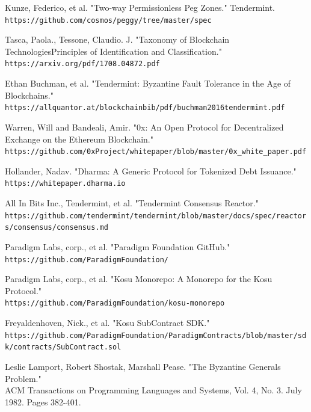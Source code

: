 \documentclass[10pt]{article}
\begin{document}
\begin{thebibliography}{9}

Kunze, Federico, et al. "Two-way Permissionless Peg Zones." Tendermint.
\\\texttt{https://github.com/cosmos/peggy/tree/master/spec}

Tasca, Paola., Tessone, Claudio. J. "Taxonomy of Blockchain TechnologiesPrinciples of Identification and Classification."
\\\texttt{https://arxiv.org/pdf/1708.04872.pdf}

Ethan Buchman, et al. "Tendermint: Byzantine Fault Tolerance in the Age of Blockchains."
\\\small\texttt{https://allquantor.at/blockchainbib/pdf/buchman2016tendermint.pdf}

Warren, Will and Bandeali, Amir. "0x: An Open Protocol for Decentralized Exchange on the Ethereum Blockchain."
\\\texttt{https://github.com/0xProject/whitepaper/blob/master/0x\_white\_paper.pdf}

Hollander, Nadav. "Dharma: A Generic Protocol for Tokenized Debt Issuance."
\\\texttt{https://whitepaper.dharma.io}

All In Bits Inc., Tendermint, et al. "Tendermint Consensus Reactor."
\\\small\texttt{https://github.com/tendermint/tendermint/blob/master/docs/spec/reactors/consensus/consensus.md}

Paradigm Labs, corp., et al. "Paradigm Foundation GitHub."
\\\small\texttt{https://github.com/ParadigmFoundation/}

Paradigm Labs, corp., et al. "Kosu Monorepo: A Monorepo for the Kosu Protocol."
\\\small\texttt{https://github.com/ParadigmFoundation/kosu-monorepo}

Freyaldenhoven, Nick., et al. "Kosu SubContract SDK."
\\\small\texttt{https://github.com/ParadigmFoundation/ParadigmContracts/blob/master/sdk/contracts/SubContract.sol}

Leslie Lamport, Robert Shostak, Marshall Pease. "The Byzantine Generals Problem."
\\ACM Transactions on Programming Languages and Systems, Vol. 4, No. 3. July 1982. Pages 382-401.

\end{thebibliography}


\end{document}
